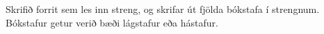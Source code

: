 \begin{problem}
	Skrifið forrit sem les inn streng, og skrifar út fjölda bókstafa í strengnum. Bókstafur getur verið bæði lágstafur eða hástafur.

\begin{example}
%
\end{example}
\begin{example}
%
\end{example}
\begin{example}
%
\end{example}
\begin{example}
%
\end{example}
\end{problem}